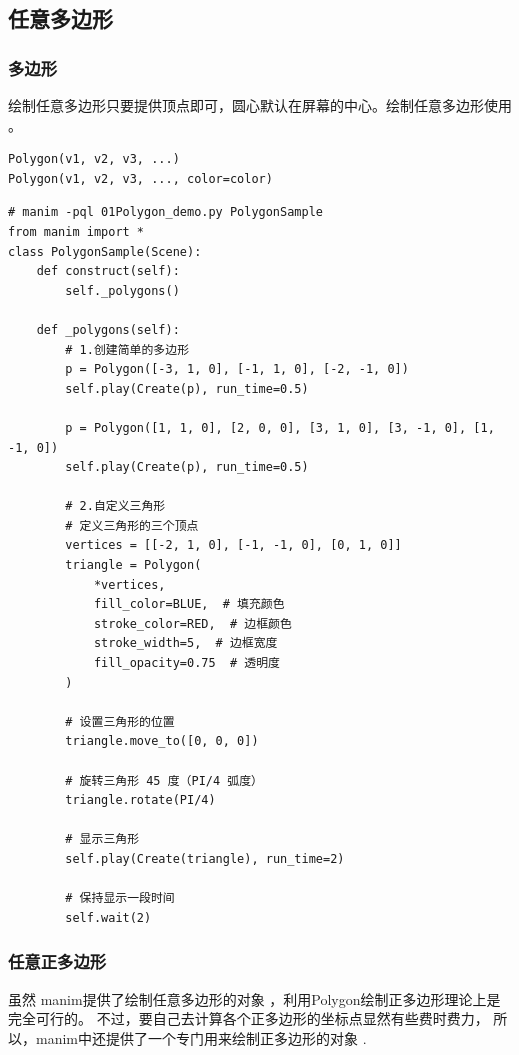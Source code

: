         

\subsection{任意多边形}
\subsubsection{多边形}
绘制任意多边形只要提供顶点即可，圆心默认在屏幕的中心。绘制任意多边形使用 。
\begin{lstlisting}[style=demostyle,numbers=none]
Polygon(v1, v2, v3, ...)
Polygon(v1, v2, v3, ..., color=color)
\end{lstlisting}

\begin{lstlisting}[style=pythonstyle]
# manim -pql 01Polygon_demo.py PolygonSample
from manim import *
class PolygonSample(Scene):
    def construct(self):
        self._polygons()

    def _polygons(self):
        # 1.创建简单的多边形
        p = Polygon([-3, 1, 0], [-1, 1, 0], [-2, -1, 0])
        self.play(Create(p), run_time=0.5)

        p = Polygon([1, 1, 0], [2, 0, 0], [3, 1, 0], [3, -1, 0], [1, -1, 0])
        self.play(Create(p), run_time=0.5)

        # 2.自定义三角形
        # 定义三角形的三个顶点
        vertices = [[-2, 1, 0], [-1, -1, 0], [0, 1, 0]]
        triangle = Polygon(
            *vertices,
            fill_color=BLUE,  # 填充颜色
            stroke_color=RED,  # 边框颜色
            stroke_width=5,  # 边框宽度
            fill_opacity=0.75  # 透明度
        )
        
        # 设置三角形的位置
        triangle.move_to([0, 0, 0])

        # 旋转三角形 45 度（PI/4 弧度）
        triangle.rotate(PI/4)

        # 显示三角形
        self.play(Create(triangle), run_time=2)

        # 保持显示一段时间
        self.wait(2)
\end{lstlisting}

\subsubsection{任意正多边形}
虽然 manim提供了绘制任意多边形的对象 ，利用Polygon绘制正多边形理论上是完全可行的。 
不过，要自己去计算各个正多边形的坐标点显然有些费时费力，
 所以，manim中还提供了一个专门用来绘制正多边形的对象 .


